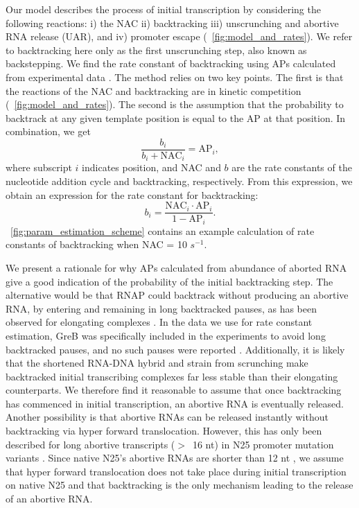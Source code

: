 %
Our model describes the process of initial transcription by considering the
following reactions: i) the NAC ii) backtracking iii) unscrunching and abortive
RNA release (UAR), and iv) promoter escape (\FIG~\ref{fig:model_and_rates}).
We refer to backtracking here only as the first unscrunching step, also known as
backstepping. We find the rate constant of backtracking using APs calculated
from experimental data \cite{hsu_quantitative_1996}. The method relies on two
key points. The first is that the reactions of the NAC and backtracking are in
kinetic competition (\FIG~\ref{fig:model_and_rates}). The second is the
assumption that the probability to backtrack at any given template position is
equal to the AP at that position. In combination, we get
\begin{equation*}
    \frac{b_i}{b_i + \text{NAC}_i} = \text{AP}_i,
\end{equation*}
where subscript $i$ indicates position, and NAC and $b$ are the rate constants
of the nucleotide addition cycle and backtracking, respectively. From this
expression, we obtain an expression for the rate constant for backtracking:
\begin{equation}
  b_i = \frac{\text{NAC}_i\cdot\text{AP}_i}{1-\text{AP}_i}.
  \label{eq:backtrackingcalc}
\end{equation}
\FIG~\ref{fig:param_estimation_scheme} contains an example calculation of rate
constants of backtracking when NAC = 10 $s^{-1}$.

We present a rationale for why APs calculated from abundance of aborted RNA
give a good indication of the probability of the initial backtracking step.
The alternative would be that RNAP could backtrack without
producing an abortive RNA, by entering and remaining in long backtracked
pauses, as has been observed for elongating complexes
\cite{shaevitz_backtracking_2003}. In the data we use for rate constant
estimation, GreB was specifically included in the experiments to avoid long
backtracked pauses, and no such pauses were reported
\cite{revyakin_abortive_2006}. Additionally, it is likely that the shortened
RNA-DNA hybrid and strain from scrunching make backtracked initial
transcribing complexes far less stable than their elongating counterparts. We
therefore find it reasonable to assume that once backtracking has commenced in
initial transcription, an abortive RNA is eventually released. Another
possibility is that abortive RNAs can be released instantly without
backtracking via hyper forward translocation. However, this has only been
described for long abortive transcripts ($>$~16 nt) in N25 promoter mutation
variants \cite{chander_alternate_2007, chander_mechanisms_2015}. Since native
N25's abortive RNAs are shorter than 12 nt \cite{chander_alternate_2007}, we
assume that hyper forward translocation does not take place during initial
transcription on native N25 and that backtracking is the only mechanism
leading to the release of an abortive RNA.

